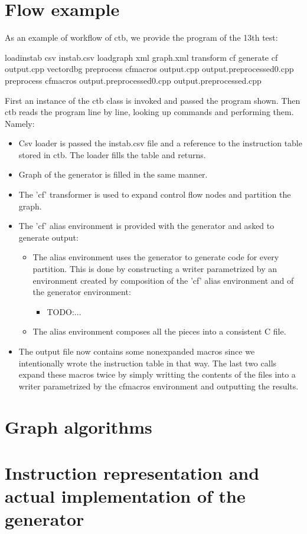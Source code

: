 
\section{Flow example}

As an example of workflow of ctb, we provide the program of the 13th test:
\begin{code}
loadinstab csv instab.csv
loadgraph xml graph.xml
transform cf
generate cf output.cpp vectordbg
preprocess cfmacros output.cpp output.preprocessed0.cpp
preprocess cfmacros output.preprocessed0.cpp output.preprocessed.cpp
\end{code}

First an instance of the ctb class is invoked and passed the program shown. Then ctb reads the program line by line, looking up commands and performing them. Namely:
\begin{itemize}
  \item Csv loader is passed the instab.csv file and a reference to the instruction table stored in ctb. The loader fills the table and returns.
  \item Graph of the generator is filled in the same manner.
  \item The 'cf' transformer is used to expand control flow nodes and partition the graph.
  \item The 'cf' alias environment is provided with the generator and asked to generate output:
  \begin{itemize}
    \item The alias environment uses the generator to generate code for every partition. This is done by constructing a writer parametrized by an environment created by composition of the 'cf' alias environment and of the generator environment:
    \begin{itemize}
      \item TODO:...
    \end{itemize}
    \item The alias environment composes all the pieces into a consistent C file.
  \end{itemize}
  \item The output file now contains some nonexpanded macros since we intentionally wrote the instruction table in that way. The last two calls expand these macros twice by simply writting the contents of the files into a writer parametrized by the cfmacros environment and outputting the results.
\end{itemize}


\section{Graph algorithms}

\section{Instruction representation and actual implementation of the generator}
